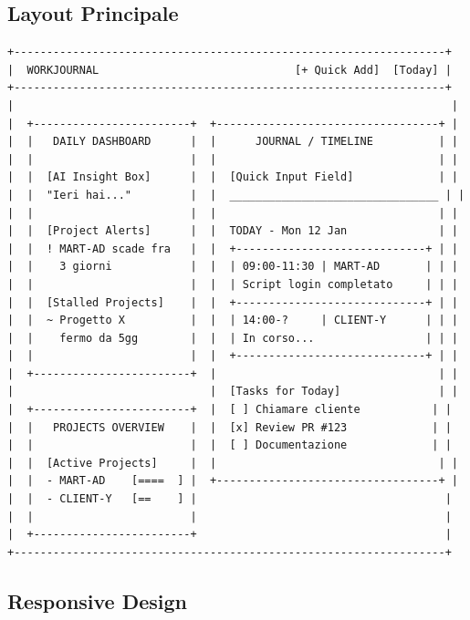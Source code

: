 \documentclass[11pt,a4paper]{article}
\begin{document}
\subsection{Layout Principale}


\begin{lstlisting}[caption=Layout WorkJournal - ASCII Wireframe]
+------------------------------------------------------------------+
|  WORKJOURNAL                              [+ Quick Add]  [Today] |
+------------------------------------------------------------------+
|                                                                   |
|  +------------------------+  +----------------------------------+ |
|  |   DAILY DASHBOARD      |  |      JOURNAL / TIMELINE          | |
|  |                        |  |                                  | |
|  |  [AI Insight Box]      |  |  [Quick Input Field]             | |
|  |  "Ieri hai..."         |  |  ________________________________ | |
|  |                        |  |                                  | |
|  |  [Project Alerts]      |  |  TODAY - Mon 12 Jan              | |
|  |  ! MART-AD scade fra   |  |  +-----------------------------+ | |
|  |    3 giorni            |  |  | 09:00-11:30 | MART-AD       | | |
|  |                        |  |  | Script login completato     | | |
|  |  [Stalled Projects]    |  |  +-----------------------------+ | |
|  |  ~ Progetto X          |  |  | 14:00-?     | CLIENT-Y      | | |
|  |    fermo da 5gg        |  |  | In corso...                 | | |
|  |                        |  |  +-----------------------------+ | |
|  +------------------------+  |                                  | |
|                              |  [Tasks for Today]               | |
|  +------------------------+  |  [ ] Chiamare cliente           | |
|  |   PROJECTS OVERVIEW    |  |  [x] Review PR #123             | |
|  |                        |  |  [ ] Documentazione             | |
|  |  [Active Projects]     |  |                                  | |
|  |  - MART-AD    [====  ] |  +----------------------------------+ |
|  |  - CLIENT-Y   [==    ] |                                      |
|  |                        |                                      |
|  +------------------------+                                      |
+------------------------------------------------------------------+
\end{lstlisting}

\subsection{Responsive Design}
\end{document}

